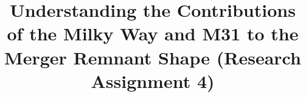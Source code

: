 \documentclass[linenumbers,trackchanges]{aastex7}
\begin{document}
\title{Understanding the Contributions of the Milky Way and M31 to the Merger Remnant Shape (Research Assignment 4)}

\end{document}
